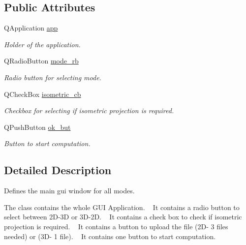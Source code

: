 \subsection*{Public Attributes}
\begin{DoxyCompactItemize}
\item 
\mbox{\label{classmain_window_aa031e8e15e2a2a27990c5dbd320bba0f}} 
Q\+Application \mbox{\hyperlink{classmain_window_aa031e8e15e2a2a27990c5dbd320bba0f}{app}}
\begin{DoxyCompactList}\small\item\em Holder of the application. \end{DoxyCompactList}\item 
Q\+Radio\+Button \mbox{\hyperlink{classmain_window_abd7445b8de425018c91f10b721e9e314}{mode\+\_\+rb}}
\begin{DoxyCompactList}\small\item\em Radio button for selecting mode. \end{DoxyCompactList}\item 
\mbox{\label{classmain_window_a70b4f48501d7fdf9a1ae5c01485a894e}} 
Q\+Check\+Box \mbox{\hyperlink{classmain_window_a70b4f48501d7fdf9a1ae5c01485a894e}{isometric\+\_\+cb}}
\begin{DoxyCompactList}\small\item\em Checkbox for selecting if isometric projection is required. \end{DoxyCompactList}\item 
\mbox{\label{classmain_window_add1c0392d7854b68f033094e1b67b3bd}} 
Q\+Push\+Button \mbox{\hyperlink{classmain_window_add1c0392d7854b68f033094e1b67b3bd}{ok\+\_\+but}}
\begin{DoxyCompactList}\small\item\em Button to start computation. \end{DoxyCompactList}\end{DoxyCompactItemize}


\subsection{Detailed Description}
Defines the main gui window for all modes. 

The class contains the whole G\+UI Application. ~\newline
It contains a radio button to select between 2\+D-\/3D or 3\+D-\/2D. ~\newline
It contains a check box to check if isometric projection is required. ~\newline
It contains a button to upload the file (2\+D-\/ 3 files needed) or (3\+D-\/ 1 file). ~\newline
It contains one button to start computation. 

